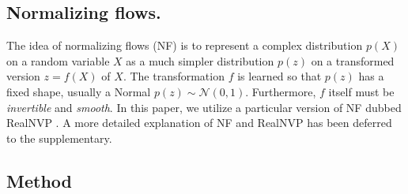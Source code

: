 \subsection{Normalizing flows.}

The idea of normalizing flows (NF) is to represent a complex distribution $p(X)$ on a random variable $X$ as a much simpler distribution $p(z)$ on a transformed version $z=f(X)$ of $X$.
The transformation $f$ is learned so that $p(z)$ has a fixed shape, usually a Normal $p(z) \sim \mathcal{N}(0,1)$. Furthermore, $f$ itself must be \emph{invertible} and \emph{smooth}.
In this paper, we utilize a particular version of NF dubbed RealNVP \cite{dinh17density}.
A more detailed explanation of NF and RealNVP has been deferred to the supplementary.



\subsection{Method}\label{s:method}

